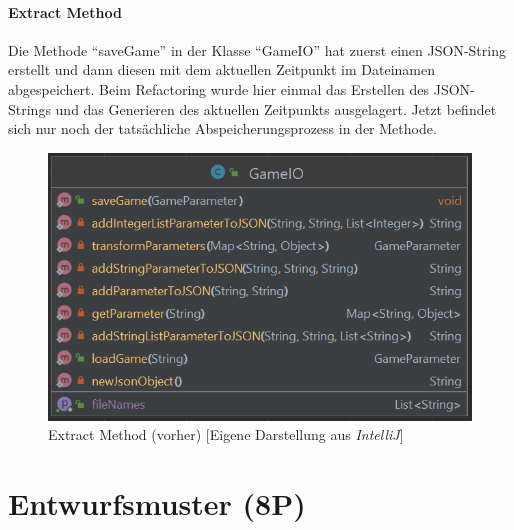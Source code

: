 \subsubsection{Extract Method}
\noindent Die Methode \enquote{saveGame} in der Klasse \enquote{GameIO} hat zuerst einen JSON-String erstellt und dann diesen mit dem aktuellen Zeitpunkt im Dateinamen abgespeichert. Beim Refactoring wurde hier einmal das Erstellen des JSON-Strings und das Generieren des aktuellen Zeitpunkts ausgelagert. Jetzt befindet sich nur noch der tatsächliche Abspeicherungsprozess in der Methode.

\begin{figure}[htbp]
\centering
\centerline{\includegraphics[scale=.5]{gameio1}}
\caption{Extract Method (vorher) [Eigene Darstellung aus \emph{IntelliJ}]}
\label{fig:gameio1}
\end{figure}

\newpage
\titlespacing*{\chapter}{0pt}{-30mm}{10pt}
  
\chapter{Entwurfsmuster (8P)}
\pagestyle{scrheadings}
\clearscrheadfoot
{}
\setcounter{page}{35}
\ofoot[\pagemark]{\pagemark}
\onehalfspacing

